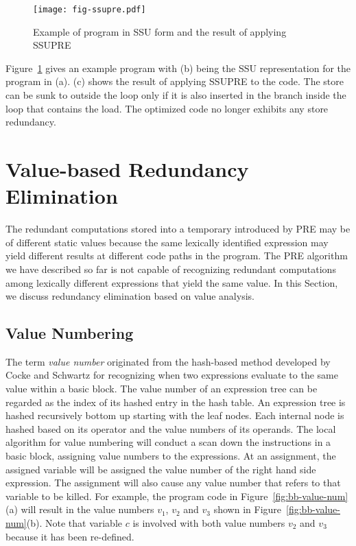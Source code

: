 \begin{figure}
\centering
\texttt{[image: fig-ssupre.pdf]}
\caption{Example of program in SSU form and the result of applying SSUPRE}
\label{fig:ssupre}
\end{figure}

Figure~\ref{fig:ssupre} gives an example program with (b) being the SSU 
representation for the program in (a).  
(c) shows the result of applying SSUPRE to the code.
The store can be sunk to outside the loop only if it is also inserted in
the branch inside the loop that contains the load.  The optimized code no
longer exhibits any store redundancy.

\section{Value-based Redundancy Elimination}
\label{section:Part3:Pre_not_helped:SemanticPRE}

The redundant computations stored into a temporary introduced by PRE may
be of different static values because the same lexically identified expression 
may yield different results at different code paths in the program.
The PRE algorithm we have described so far is not capable
of recognizing redundant computations among lexically different expressions
that yield the same value.  In this Section, we discuss redundancy elimination
based on value analysis.

\subsection{Value Numbering}
\label{sec:pre_not_helped:GVN}
The term \emph{value number} originated from the 
hash-based method developed by Cocke and Schwartz for recognizing when two
expressions evaluate to the same value within a basic block.  
The value number of an expression tree can be regarded as the index of its
hashed entry in the hash table.  
An expression tree is hashed recursively bottom up starting with the leaf nodes.
Each internal node is hashed based on its operator and the value numbers of 
its operands.  The local algorithm for value numbering will conduct a scan
down the instructions in a basic block, assigning value numbers to the
expressions.  At an assignment, the assigned variable will be assigned
the value number of the right hand side expression.  The assignment will also
cause any value number that refers to that variable to be killed. For example,
the program code in Figure~\ref{fig:bb-value-num}(a) will result in the
value numbers $v_1$, $v_2$ and $v_3$ shown in Figure~\ref{fig:bb-value-num}(b).
Note that variable $c$ is involved with both value numbers $v_2$ and $v_3$
because it has been re-defined.

